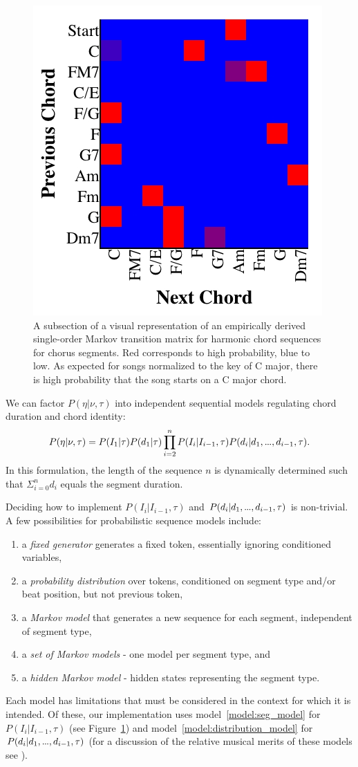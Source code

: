 \documentclass[phd,electronic,oneside,twosidetoc,letterpaper,chaptercenter,parttop,lof,lot]{byumsphd}
\newcommand\mydots{\hbox to .75em{.\hss.\hss.}}
\begin{document}
\begin{figure}
	\centering
	\includegraphics[width=.6\linewidth]{harmony}
	\caption{\label{fig:harmony} A subsection of a visual representation of an empirically derived single-order Markov transition matrix for harmonic chord sequences for chorus segments. Red corresponds to high probability, blue to low. As expected for songs normalized to the key of C major, there is high probability that the song starts on a C major chord. }
\end{figure}

We can factor $P(\eta|\nu,\tau)$ into independent sequential models regulating chord duration and chord identity:
\small
\[ P(\eta|\nu,\tau) = P(I_1|\tau) P(d_1|\tau) \prod_{i=2}^n P(I_i|I_{i-1},\tau) P(d_i | d_1,\mydots,d_{i-1},\tau). \]
\normalsize
\noindent  In this formulation, the length of the sequence $n$ is dynamically determined such that $\Sigma_{i=0}^n d_i$ equals the segment duration.

Deciding how to implement $P(I_i|I_{i-1},\tau)$ and $P(d_i | d_1,\mydots,d_{i-1},\tau)$ is non-trivial. A few possibilities for probabilistic sequence models include:
\begin{enumerate}
\item a \textit{fixed generator} generates a fixed token, essentially ignoring conditioned variables,
\item \label{model:distribution_model}a \textit{probability distribution} over tokens, conditioned on segment type and/or beat position, but not previous token,
\item a \textit{Markov model} that generates a new sequence for each segment, independent of segment type,
\item \label{model:seg_model}a \textit{set of Markov models} - one model per segment type, and
\item a \textit{hidden Markov model} - hidden states representing the segment type.
\end{enumerate}
\noindent Each model has limitations that must be considered in the context for which it is intended. Of these, our implementation uses model~\ref{model:seg_model} for $P(I_i|I_{i-1},\tau)$ (see Figure~\ref{fig:harmony}) and model~\ref{model:distribution_model} for $P(d_i | d_1,\mydots,d_{i-1},\tau)$ (for a discussion of the relative musical merits of these models see \citeauthor{bodily2017Mume} \cite{bodily2017Mume}).
\end{document}

